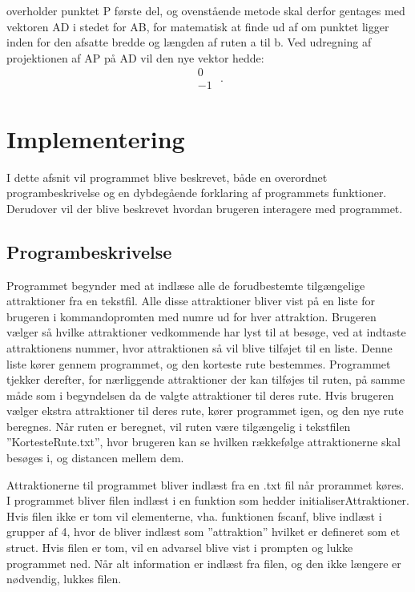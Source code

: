 overholder punktet P første del, og ovenstående metode skal derfor gentages med vektoren AD i stedet for AB, for matematisk at finde ud af om punktet ligger inden 	for den afsatte bredde og længden af ruten a til b. Ved udregning af projektionen af AP på AD vil den nye vektor hedde: \[ \begin{matrix} 0 \\ -1 \end{matrix} \text{ .} \]


\section{Implementering}
I dette afsnit vil programmet blive beskrevet, både en overordnet programbeskrivelse og en dybdegående forklaring af programmets funktioner. Derudover vil der blive beskrevet hvordan brugeren interagere med programmet. 

\subsection{Programbeskrivelse}
Programmet begynder med at indlæse alle de forudbestemte tilgængelige attraktioner fra en tekstfil. Alle disse attraktioner bliver vist på en liste for brugeren i kommandopromten med numre ud for hver attraktion. Brugeren vælger så hvilke attraktioner vedkommende har lyst til at besøge, ved at indtaste attraktionens nummer, hvor attraktionen så vil blive tilføjet til en liste. Denne liste kører gennem programmet, og den korteste rute bestemmes. Programmet tjekker derefter, for nærliggende attraktioner der kan tilføjes til ruten, på samme måde som i begyndelsen da de valgte attraktioner til deres rute. Hvis brugeren vælger ekstra attraktioner til deres rute, kører programmet igen, og den nye rute beregnes. Når ruten er beregnet, vil ruten være tilgængelig i tekstfilen ”KortesteRute.txt”, hvor brugeren kan se hvilken rækkefølge attraktionerne skal besøges i, og distancen mellem dem. 

Attraktionerne til programmet bliver indlæst fra en .txt fil når prorammet køres. I programmet bliver filen indlæst i en funktion som hedder initialiserAttraktioner. Hvis filen ikke er tom vil elementerne, vha. funktionen fscanf, blive indlæst i grupper af 4, hvor de bliver indlæst som ”attraktion” hvilket er defineret som et struct. Hvis filen er tom, vil en advarsel blive vist i prompten og lukke programmet ned. Når alt information er indlæst fra filen, og den ikke længere er nødvendig, lukkes filen.


